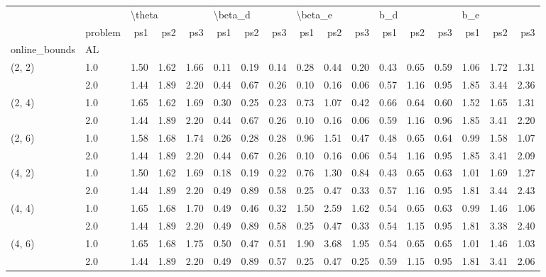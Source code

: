 \begin{tabular}{llrrrrrrrrrrrrrrr}
\toprule
       & {} & \multicolumn{3}{l}{\textbackslash theta} & \multicolumn{3}{l}{\textbackslash beta\_d} & \multicolumn{3}{l}{\textbackslash beta\_e} & \multicolumn{3}{l}{b\_d} & \multicolumn{3}{l}{b\_e} \\
       & problem &    ps1 &  ps2 &  ps3 &     ps1 &  ps2 &  ps3 &     ps1 &  ps2 &  ps3 &  ps1 &  ps2 &  ps3 &  ps1 &  ps2 &  ps3 \\
online\_bounds & AL &        &      &      &         &      &      &         &      &      &      &      &      &      &      &      \\
\midrule
(2, 2) & 1.0 &   1.50 & 1.62 & 1.66 &    0.11 & 0.19 & 0.14 &    0.28 & 0.44 & 0.20 & 0.43 & 0.65 & 0.59 & 1.06 & 1.72 & 1.31 \\
       & 2.0 &   1.44 & 1.89 & 2.20 &    0.44 & 0.67 & 0.26 &    0.10 & 0.16 & 0.06 & 0.57 & 1.16 & 0.95 & 1.85 & 3.44 & 2.36 \\
(2, 4) & 1.0 &   1.65 & 1.62 & 1.69 &    0.30 & 0.25 & 0.23 &    0.73 & 1.07 & 0.42 & 0.66 & 0.64 & 0.60 & 1.52 & 1.65 & 1.31 \\
       & 2.0 &   1.44 & 1.89 & 2.20 &    0.44 & 0.67 & 0.26 &    0.10 & 0.16 & 0.06 & 0.59 & 1.16 & 0.96 & 1.85 & 3.41 & 2.20 \\
(2, 6) & 1.0 &   1.58 & 1.68 & 1.74 &    0.26 & 0.28 & 0.28 &    0.96 & 1.51 & 0.47 & 0.48 & 0.65 & 0.64 & 0.99 & 1.58 & 1.07 \\
       & 2.0 &   1.44 & 1.89 & 2.20 &    0.44 & 0.67 & 0.26 &    0.10 & 0.16 & 0.06 & 0.54 & 1.16 & 0.95 & 1.85 & 3.41 & 2.09 \\
(4, 2) & 1.0 &   1.50 & 1.62 & 1.69 &    0.18 & 0.19 & 0.22 &    0.76 & 1.30 & 0.84 & 0.43 & 0.65 & 0.63 & 1.01 & 1.69 & 1.27 \\
       & 2.0 &   1.44 & 1.89 & 2.20 &    0.49 & 0.89 & 0.58 &    0.25 & 0.47 & 0.33 & 0.57 & 1.16 & 0.95 & 1.81 & 3.44 & 2.43 \\
(4, 4) & 1.0 &   1.65 & 1.68 & 1.70 &    0.49 & 0.46 & 0.32 &    1.50 & 2.59 & 1.62 & 0.54 & 0.65 & 0.63 & 0.99 & 1.46 & 1.06 \\
       & 2.0 &   1.44 & 1.89 & 2.20 &    0.49 & 0.89 & 0.58 &    0.25 & 0.47 & 0.33 & 0.54 & 1.15 & 0.95 & 1.81 & 3.38 & 2.40 \\
(4, 6) & 1.0 &   1.65 & 1.68 & 1.75 &    0.50 & 0.47 & 0.51 &    1.90 & 3.68 & 1.95 & 0.54 & 0.65 & 0.65 & 1.01 & 1.46 & 1.03 \\
       & 2.0 &   1.44 & 1.89 & 2.20 &    0.49 & 0.89 & 0.57 &    0.25 & 0.47 & 0.25 & 0.59 & 1.15 & 0.95 & 1.81 & 3.41 & 2.06 \\

\end{tabular}

